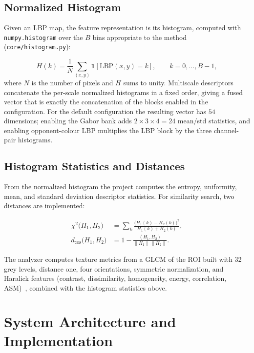 \documentclass[conference]{IEEEtran}
\begin{document}
\subsection{Normalized Histogram}
Given an LBP map, the feature representation is its histogram, computed
with \texttt{numpy.histogram} over the $B$ bins appropriate to the method
(\texttt{core/histogram.py}):

\begin{equation}
H(k)=\frac{1}{N}\sum_{(x,y)}\mathbf{1}\!\left[\mathrm{LBP}(x,y)=k\right],
\qquad k=0,\dots,B-1,
\label{eq:hist}
\end{equation}
where $N$ is the number of pixels and $H$ sums to unity. Multiscale
descriptors concatenate the per-scale normalized histograms in a fixed
order, giving a fused vector that is exactly the concatenation of the
blocks enabled in the configuration. For the default configuration the
resulting vector has $54$ dimensions; enabling the Gabor bank adds
$2\times 3\times 4=24$ mean/std statistics, and enabling opponent-colour
LBP multiplies the LBP block by the three channel-pair histograms.

\subsection{Histogram Statistics and Distances}
From the normalized histogram the project computes the entropy, uniformity,
mean, and standard deviation descriptor statistics. For similarity search,
two distances are implemented:

\begin{equation}
\begin{aligned}
\chi^2\bigl(H_1,H_2\bigr)&=\sum_{k}\frac{\bigl(H_1(k)-H_2(k)\bigr)^2}{H_1(k)+H_2(k)},\\
d_{\text{cos}}\bigl(H_1,H_2\bigr)&=1-\frac{\left\langle H_1,H_2\right\rangle}
{\lVert H_1\rVert\,\lVert H_2\rVert}.
\end{aligned}
\label{eq:dist}
\end{equation}

The analyzer computes texture metrics from a GLCM of the ROI built with 32
grey levels, distance one, four orientations, symmetric normalization, and
Haralick features (contrast, dissimilarity, homogeneity, energy,
correlation, ASM)~\cite{haralick1973}, combined with the histogram
statistics above.

\section{System Architecture and Implementation}\label{sec:arch}
\end{document}
